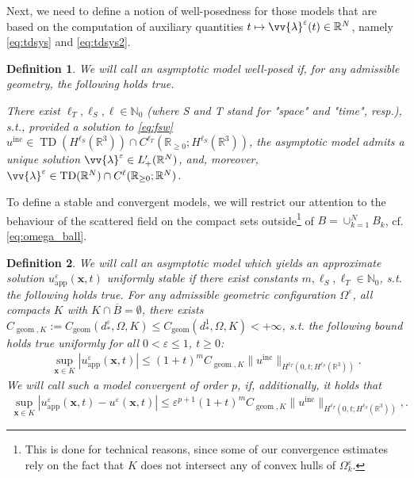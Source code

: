 \documentclass[]{article}
\newtheorem{definition}{Definition}
\numberwithin{equation}{section}
\numberwithin{theorem}{section}
\numberwithin{lemma}{section}
\numberwithin{corollary}{section}
\numberwithin{proposition}{section}
\numberwithin{definition}{section}
\newcommand{\bx}{\boldsymbol{x}}
\newcommand{\re}{\varepsilon}
\renewcommand{\vec}{\boldsymbol}
\begin{document}
	Next, we need to define a notion of well-posedness for those models that are based on the computation of auxiliary quantities $t\mapsto\vv{\lambda}^{\re}(t)\in \mathbb{R}^N$, namely \eqref{eq:tdsys} and \eqref{eq:tdsys2}.
	\begin{definition}
		\label{def:well_posedness}
		We will call an asymptotic model well-posed if, for any admissible geometry, the following holds true.
		
		There exist $\ell_T,\ell_S, \ell\in \mathbb{N}_0$ (where S and T stand for "space" and "time", resp.), s.t., provided a solution to \eqref{eq:fsw} $u^{\operatorname{inc}}\in \operatorname{TD}(H^{\ell_S}(\mathbb{R}^3))\cap C^{\ell_T}(\mathbb{R}_{\geq 0}; H^{\ell_S}(\mathbb{R}^3))$, the asymptotic model admits a unique solution $\vv{\lambda}^{\re}\in L'_{+}(\mathbb{R}^N)$, and, moreover,  $\vv{\lambda}^{\re}\in \operatorname{TD}(\mathbb{R}^N)\cap C^{\ell}(\mathbb{R}_{\geq 0}; \mathbb{R}^N)$.
	\end{definition}
	To define a stable and convergent models, we will restrict our attention to the behaviour of the scattered field on the compact sets outside\footnote{This is done for technical reasons, since some of our convergence estimates rely on the fact that $K$ does not intersect any of convex hulls of $\Omega^{\re}_k$.} of $B=\cup_{k=1}^NB_k$, cf. \eqref{eq:omega_ball}. 
	\begin{definition}
		We will call an asymptotic model which yields an approximate solution $u^{\re}_{\operatorname{\operatorname{app}}}(\vec{x},t)$  uniformly stable if there exist constants $m, \ell_S, \ell_T\in \mathbb{N}_0$, s.t. the following holds true. \textit{For any admissible geometric configuration} $\Omega^{\re}$, all compacts $K$ with $K\cap \overline{B}=\emptyset$, there exists $C_{\operatorname{geom},K}:=C_{\operatorname{geom}}(d_*^{\re}, \Omega, K)\leq C_{\operatorname{geom}}(d^1_*, \Omega, K)<+\infty$,  s.t. the following bound holds true uniformly for all $0<\varepsilon\leq 1$, $t\geq 0$:
		\begin{align*}%
			\sup\limits_{\vec{x}\in K}|u^{\re}_{\operatorname{\operatorname{app}}}(\vec{x},t)|\leq (1+t)^mC_{\operatorname{geom},K}\|u^{\operatorname{inc}}\|_{H^{\ell_T}(0,t; H^{\ell_S}(\mathbb{R}^3))}.
		\end{align*}
		We will call such a model convergent of order $p$, if, additionally, it holds that 
		\begin{align*}%
			\sup\limits_{\vec{x}\in K}|u^{\re}_{\operatorname{\operatorname{app}}}(\bx,t)-u^{\re}(\bx,t)|\leq \varepsilon^{p+1}(1+t)^mC_{\operatorname{geom},K}\|u^{\operatorname{inc}}\|_{H^{\ell_T}(0,t; H^{\ell_S}(\mathbb{R}^3))},.
		\end{align*}
	\end{definition}
\end{document}
